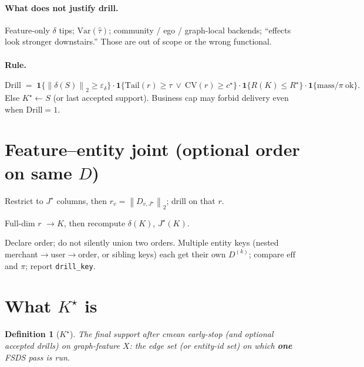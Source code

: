 \documentclass[11pt]{article}
\newtheorem{definition}{Definition}
\newcommand{\norm}[1]{\left\|#1\right\|_2}
\begin{document}
\paragraph{What does not justify drill.}
Feature-only $\delta$ tips; $\mathrm{Var}(\hat\tau)$; community /
ego / graph-local backends; ``effects look stronger downstairs.''
Those are out of scope or the wrong functional.

\paragraph{Rule.}
\[
  \mathrm{Drill}
  \;=\;
  \mathbf{1}\{\norm{\delta(S)}\ge\varepsilon_\delta\}
  \cdot
  \mathbf{1}\{\mathrm{Tail}(r)\ge\tau\ \lor\ \mathrm{CV}(r)\ge c^\star\}
  \cdot
  \mathbf{1}\{R(K)\le R^\star\}
  \cdot
  \mathbf{1}\{\mathrm{mass}/\pi\ \mathrm{ok}\}.
\]
Else $K^\star\leftarrow S$ (or last accepted support). Business cap may
forbid delivery even when $\mathrm{Drill}=1$.

\section{Feature--entity joint (optional order on same $D$)}
\label{sec:joint}

\begin{description}[leftmargin=1.8em]
  \item[$\mathrm{F}\to\mathrm{E}$ (default)]
    Restrict to $J^\star$ columns, then $r_v=\norm{D_{v,J^\star}}$;
    drill on that $r$.
  \item[$\mathrm{E}\to\mathrm{F}$]
    Full-dim $r$ $\to K$, then recompute $\delta(K)$, $J^\star(K)$.
\end{description}
Declare order; do not silently union two orders.
Multiple entity keys (nested merchant$\to$user$\to$order, or sibling
keys) each get their own $D^{(k)}$; compare $\mathrm{eff}$ and $\pi$;
report \texttt{drill\_key}.

\section{What $K^\star$ is}
\label{sec:kstar}

\begin{definition}[$K^\star$]
The final support after cmean early-stop (and optional accepted drills)
on graph-feature $X$: the edge set (or entity-id set) on which
\textbf{one} FSDS pass is run.
\end{definition}
\end{document}

